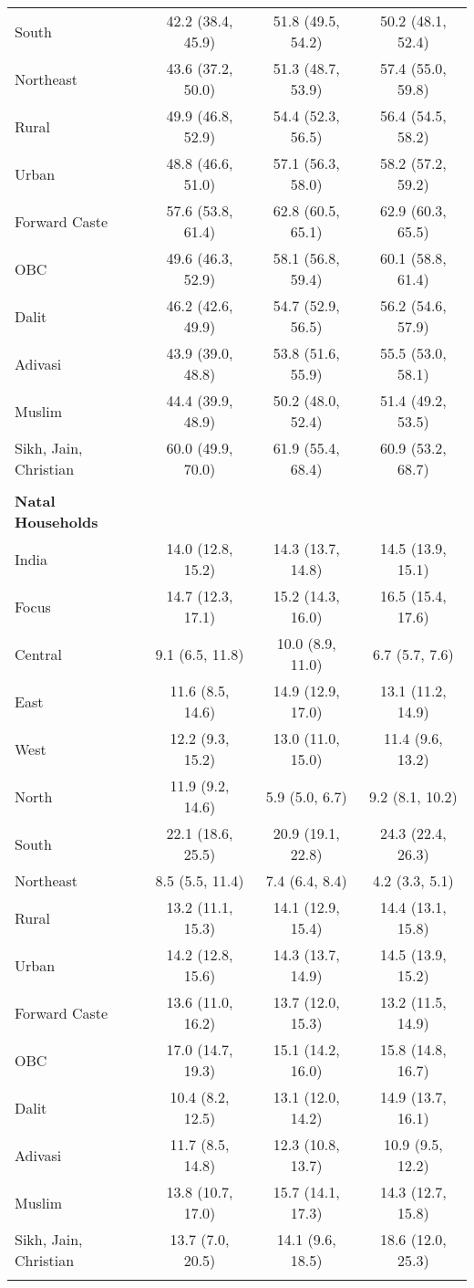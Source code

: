 \begin{tabular}{lccc}
South&42.2 (38.4, 45.9)&51.8 (49.5, 54.2)&50.2 (48.1, 52.4)\\
Northeast&43.6 (37.2, 50.0)&51.3 (48.7, 53.9)&57.4 (55.0, 59.8)\\
Rural&49.9 (46.8, 52.9)&54.4 (52.3, 56.5)&56.4 (54.5, 58.2)\\
Urban&48.8 (46.6, 51.0)&57.1 (56.3, 58.0)&58.2 (57.2, 59.2)\\
Forward Caste&57.6 (53.8, 61.4)&62.8 (60.5, 65.1)&62.9 (60.3, 65.5)\\
OBC&49.6 (46.3, 52.9)&58.1 (56.8, 59.4)&60.1 (58.8, 61.4)\\
Dalit&46.2 (42.6, 49.9)&54.7 (52.9, 56.5)&56.2 (54.6, 57.9)\\
Adivasi&43.9 (39.0, 48.8)&53.8 (51.6, 55.9)&55.5 (53.0, 58.1)\\
Muslim&44.4 (39.9, 48.9)&50.2 (48.0, 52.4)&51.4 (49.2, 53.5)\\
Sikh, Jain, Christian&60.0 (49.9, 70.0)&61.9 (55.4, 68.4)&60.9 (53.2, 68.7)\\
&&&\\
\textbf{Natal Households}&&&\\
India&14.0 (12.8, 15.2)&14.3 (13.7, 14.8)&14.5 (13.9, 15.1)\\
Focus&14.7 (12.3, 17.1)&15.2 (14.3, 16.0)&16.5 (15.4, 17.6)\\
Central&9.1 (6.5, 11.8)&10.0 (8.9, 11.0)&6.7 (5.7, 7.6)\\
East&11.6 (8.5, 14.6)&14.9 (12.9, 17.0)&13.1 (11.2, 14.9)\\
West&12.2 (9.3, 15.2)&13.0 (11.0, 15.0)&11.4 (9.6, 13.2)\\
North&11.9 (9.2, 14.6)&5.9 (5.0, 6.7)&9.2 (8.1, 10.2)\\
South&22.1 (18.6, 25.5)&20.9 (19.1, 22.8)&24.3 (22.4, 26.3)\\
Northeast&8.5 (5.5, 11.4)&7.4 (6.4, 8.4)&4.2 (3.3, 5.1)\\
Rural&13.2 (11.1, 15.3)&14.1 (12.9, 15.4)&14.4 (13.1, 15.8)\\
Urban&14.2 (12.8, 15.6)&14.3 (13.7, 14.9)&14.5 (13.9, 15.2)\\
Forward Caste&13.6 (11.0, 16.2)&13.7 (12.0, 15.3)&13.2 (11.5, 14.9)\\
OBC&17.0 (14.7, 19.3)&15.1 (14.2, 16.0)&15.8 (14.8, 16.7)\\
Dalit&10.4 (8.2, 12.5)&13.1 (12.0, 14.2)&14.9 (13.7, 16.1)\\
Adivasi&11.7 (8.5, 14.8)&12.3 (10.8, 13.7)&10.9 (9.5, 12.2)\\
Muslim&13.8 (10.7, 17.0)&15.7 (14.1, 17.3)&14.3 (12.7, 15.8)\\
Sikh, Jain, Christian&13.7 (7.0, 20.5)&14.1 (9.6, 18.5)&18.6 (12.0, 25.3)\\
&&&\\
\bottomrule
\end{tabular}
